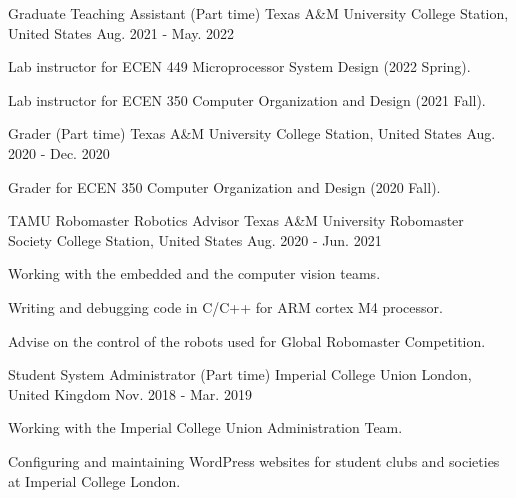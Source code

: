 
\begin{cventries}
  \cventry
    {Graduate Teaching Assistant (Part time)} %
    {Texas A\&M University} %
    {College Station, United States} %
    {Aug. 2021 - May. 2022} %
    {
      \begin{cvitems} %
        \item {Lab instructor for ECEN 449 Microprocessor System Design (2022 Spring).}
        \item {Lab instructor for ECEN 350 Computer Organization and Design (2021 Fall).}
      \end{cvitems}
    }
    
  \cventry
    {Grader (Part time)} %
    {Texas A\&M University} %
    {College Station, United States} %
    {Aug. 2020 - Dec. 2020} %
    {
      \begin{cvitems} %
        \item {Grader for ECEN 350 Computer Organization and Design (2020 Fall).}
      \end{cvitems}
    }
    
  \cventry
    {TAMU Robomaster Robotics Advisor} %
    {Texas A\&M University Robomaster Society} %
    {College Station, United States} %
    {Aug. 2020 - Jun. 2021} %
    {
      \begin{cvitems} %
        \item {Working with the embedded and the computer vision teams.}
        \item {Writing and debugging code in C/C++ for ARM cortex M4 processor.}
        \item {Advise on the control of the robots used for Global Robomaster Competition.}
      \end{cvitems}
    }

  \cventry
    {Student System Administrator (Part time)} %
    {Imperial College Union} %
    {London, United Kingdom} %
    {Nov. 2018 - Mar. 2019} %
    {
      \begin{cvitems} %
        \item {Working with the Imperial College Union Administration Team.}
        \item {Configuring and maintaining WordPress websites for student clubs and societies at Imperial College London.}
      \end{cvitems}
    }


\end{cventries}
